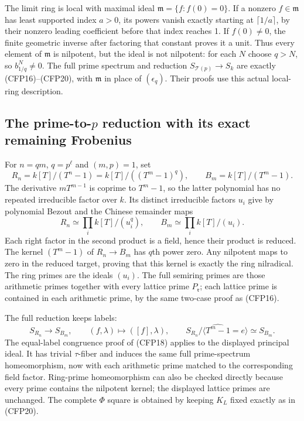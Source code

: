 The limit ring is local with maximal ideal
$\mathfrak m=\{f:f(0)=0\}$. If a nonzero
$f\in\mathfrak m$ has least supported
index $a>0$, its powers vanish exactly
starting at $\lceil1/a\rceil$, by their
nonzero leading coefficient before that
index reaches 1. If $f(0)\ne0$, the finite
geometric inverse after factoring that
constant proves it a unit. Thus every
element of $\mathfrak m$ is nilpotent,
but the ideal is not nilpotent: for each
$N$ choose $q>N$, so $b_{1/q}^N\ne0$.
The full prime spectrum and reduction
$S_{\mathcal T(p)}\to S_k$ are exactly
(CFP16)--(CFP20), with $\mathfrak m$
in place of $(\epsilon_q)$. Their proofs
use this actual local-ring description.

\subsection{The prime-to-$p$ reduction with its exact remaining Frobenius}

For $n=qm$, $q=p^\ell$ and $(m,p)=1$, set
\begin{equation}\tag{CFP27}
 R_n=k[T]/(T^n-1)
        =k[T]/((T^m-1)^q),\qquad
 B_m=k[T]/(T^m-1).
\end{equation}
The derivative $mT^{m-1}$ is coprime to
$T^m-1$, so the latter polynomial has
no repeated irreducible factor over $k$.
Its distinct irreducible factors $u_i$
give by polynomial Bezout and the Chinese
remainder maps
\begin{equation}\tag{CFP28}
 R_n\simeq\prod_i k[T]/(u_i^q),\qquad
 B_m\simeq\prod_i k[T]/(u_i).
\end{equation}
Each right factor in the second product
is a field, hence their product is
reduced. The kernel $(T^m-1)$ of
$R_n\to B_m$ has $q$th power zero.
Any nilpotent maps to zero in the
reduced target, proving that this
kernel is exactly the ring nilradical.
The ring primes are the ideals $(u_i)$.
The full semiring primes are those
arithmetic primes together with every
lattice prime $P_{\mathfrak r}$;
each lattice prime is contained in
each arithmetic prime, by the same
two-case proof as (CFP16).

The full reduction keeps labels:
\begin{equation}\tag{CFP29}
 S_{R_n}\longrightarrow S_{B_m},\qquad
 (f,\lambda)\longmapsto([f],\lambda),\qquad
 S_{R_n}/\langle\widehat{T^m-1}=e\rangle\simeq S_{B_m}.
\end{equation}
The equal-label congruence proof of
(CFP18) applies to the displayed
principal ideal. It has trivial
$\tau$-fiber and induces the same
full prime-spectrum homeomorphism,
now with each arithmetic prime
matched to the corresponding field
factor. Ring-prime homeomorphism
can also be checked directly because
every prime contains the nilpotent
kernel; the displayed lattice primes
are unchanged. The complete $\Phi$
square is obtained by keeping $K_L$
fixed exactly as in (CFP20).

